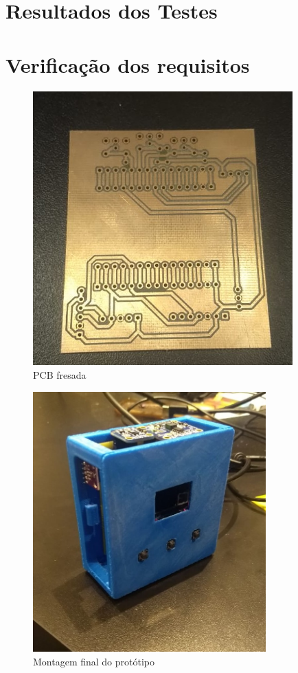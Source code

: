 \documentclass[../monografia.tex]{subfiles}
\begin{document}

\section{Resultados dos Testes}
\section{Verificação dos requisitos}

\begin{figure}[h!]
	\centering
	\includegraphics[width=10cm]{pcb-fresada}
	\caption{PCB fresada}
	\label{fig:img5}
	\end{figure}
	

\begin{figure}[h]
	\centering
	\includegraphics[width=0.8\textwidth]{montagem-final.jpg}
	\caption{Montagem final do protótipo}
	\label{fig:prototipo}
\end{figure}
\end{document}
